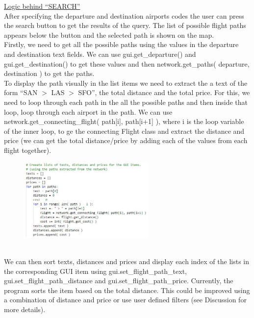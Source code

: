 \documentclass[fontsize=11pt]{article}
\begin{document}
\noindent
\underline{Logic behind “SEARCH”}\\

\noindent
After specifying the departure and destination airports codes the user can press the search button to get the results of the query. The list of possible flight paths appears below the button and the selected path is shown on the map.\\

\noindent
Firstly, we need to get all the possible paths using the values in the departure and destination text fields. We can use gui.get\_departure() and gui.get\_destination() to get these values and then network.get\_paths( departure, destination ) to get the paths.\\

\noindent
To display the path visually in the list items we need to extract the a text of the form “SAN $>$ LAS $>$ SFO”, the total distance and the total price. For this, we need to loop through each path in the all the possible paths and then inside that loop, loop through each airport in the path. We can use network.get\_connecting\_flight( path[i], path[i+1] ), where i is the loop variable of the inner loop, to ge the connecting Flight class and extract the distance and price (we can get the total distance/price by adding each of the values from each flight together).\\

\begin{figure}
    \includegraphics[width=0.6\textwidth]{code2.jpg}
\end{figure} \\

\noindent
We can then sort texts, distances and prices and display each index of the lists in the corresponding GUI item using gui.set\_flight\_path\_text, gui.set\_flight\_path\_distance and gui.set\_flight\_path\_price. Currently, the program sorts the item based on the total distance. This could be improved using a combination of distance and price or use user defined filters (see Discussion for more details).\\
\end{document}
